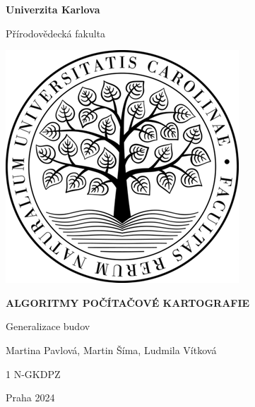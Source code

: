 \documentclass{article}
\begin{document}
\begin{titlepage}
    \centering
    \Large\textbf{Univerzita Karlova}
    
    \Large{Přírodovědecká fakulta}
    
    \vspace*{2.5cm}
    \includegraphics[width=0.55\linewidth]{images/prf.png}
    \vspace*{4cm}
    
    \Large\textbf{ALGORITMY POČÍTAČOVÉ KARTOGRAFIE}
    
    \Large{Generalizace budov}
    
    \vspace*{3cm}
    \large Martina Pavlová, Martin Šíma, Ludmila Vítková

    1 N-GKDPZ
    
    Praha 2024
\end{titlepage}
\end{document}
